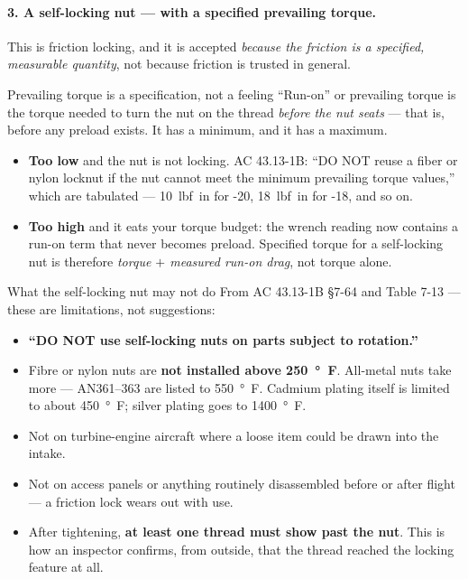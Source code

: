 \documentclass[11pt,a4paper]{article}
\begin{document}
\paragraph{3. A self-locking nut --- with a specified prevailing torque.} This is friction locking,
and it is accepted \emph{because the friction is a specified, measurable quantity}, not because
friction is trusted in general.

\begin{keybox}{Prevailing torque is a specification, not a feeling}
``Run-on'' or prevailing torque is the torque needed to turn the nut on the thread \emph{before the
nut seats} --- that is, before any preload exists. It has a minimum, and it has a maximum.

\begin{itemize}[leftmargin=*,itemsep=1pt]
\item \textbf{Too low} and the nut is not locking. AC 43.13-1B: ``DO NOT reuse a fiber or nylon
  locknut if the nut cannot meet the minimum prevailing torque values,'' which are tabulated ---
  \SI{10}{lbf.in} for -20, \SI{18}{lbf.in} for -18, and so on.
\item \textbf{Too high} and it eats your torque budget: the wrench reading now contains a run-on
  term that never becomes preload. Specified torque for a self-locking nut is therefore
  \emph{torque $+$ measured run-on drag}, not torque alone.
\end{itemize}
\end{keybox}

\begin{aerobox}{What the self-locking nut may not do}
From AC 43.13-1B \S7-64 and Table 7-13 --- these are limitations, not suggestions:
\begin{itemize}[leftmargin=*,itemsep=1pt]
\item \textbf{``DO NOT use self-locking nuts on parts subject to rotation.''}
\item Fibre or nylon nuts are \textbf{not installed above \SI{250}{\degree F}}. All-metal nuts take
  more --- AN361--363 are listed to \SI{550}{\degree F}. Cadmium plating itself is limited to about
  \SI{450}{\degree F}; silver plating goes to \SI{1400}{\degree F}.
\item Not on turbine-engine aircraft where a loose item could be drawn into the intake.
\item Not on access panels or anything routinely disassembled before or after flight --- a friction
  lock wears out with use.
\item After tightening, \textbf{at least one thread must show past the nut}. This is how an
  inspector confirms, from outside, that the thread reached the locking feature at all.
\end{itemize}
\end{aerobox}
\end{document}
